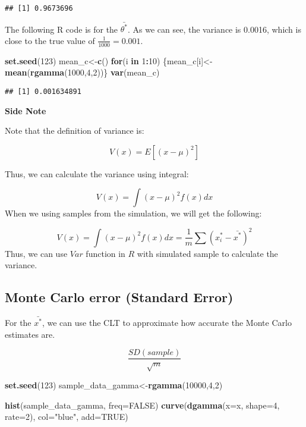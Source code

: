 \documentclass[]{book}
\newenvironment{Shaded}{\begin{snugshade}}{\end{snugshade}}
\newcommand{\ControlFlowTok}[1]{\textcolor[rgb]{0.13,0.29,0.53}{\textbf{#1}}}
\newcommand{\DataTypeTok}[1]{\textcolor[rgb]{0.13,0.29,0.53}{#1}}
\newcommand{\DecValTok}[1]{\textcolor[rgb]{0.00,0.00,0.81}{#1}}
\newcommand{\KeywordTok}[1]{\textcolor[rgb]{0.13,0.29,0.53}{\textbf{#1}}}
\newcommand{\NormalTok}[1]{#1}
\newcommand{\OperatorTok}[1]{\textcolor[rgb]{0.81,0.36,0.00}{\textbf{#1}}}
\newcommand{\OtherTok}[1]{\textcolor[rgb]{0.56,0.35,0.01}{#1}}
\newcommand{\StringTok}[1]{\textcolor[rgb]{0.31,0.60,0.02}{#1}}
\begin{document}
\begin{verbatim}
## [1] 0.9673696
\end{verbatim}

The following R code is for the \(\bar{\theta^*}\). As we can see, the variance is 0.0016, which is close to the true value of \(\frac{1}{1000}=0.001\).

\begin{Shaded}
\begin{Highlighting}[]
\KeywordTok{set.seed}\NormalTok{(}\DecValTok{123}\NormalTok{)}
\NormalTok{mean_c<-}\KeywordTok{c}\NormalTok{()}
\ControlFlowTok{for}\NormalTok{(i }\ControlFlowTok{in} \DecValTok{1}\OperatorTok{:}\DecValTok{10}\NormalTok{)}
\NormalTok{\{mean_c[i]<-}\KeywordTok{mean}\NormalTok{(}\KeywordTok{rgamma}\NormalTok{(}\DecValTok{1000}\NormalTok{,}\DecValTok{4}\NormalTok{,}\DecValTok{2}\NormalTok{))\}}
\KeywordTok{var}\NormalTok{(mean_c)}
\end{Highlighting}
\end{Shaded}

\begin{verbatim}
## [1] 0.001634891
\end{verbatim}

\textbf{Side Note}

Note that the definition of variance is:

\[V(x)=E[(x-\mu)^2]\]

Thus, we can calculate the variance using integral:

\[V(x)=\int (x-\mu)^2 f(x)dx\]
When we using samples from the simulation, we will get the following:

\[V(x)=\int (x-\mu)^2 f(x)dx= \frac{1}{m} \sum (x_i^*-\bar{x^*})^2\]
Thus, we can use \(Var\) function in \(R\) with simulated sample to calculate the variance.

\hypertarget{monte-carlo-error-standard-error}{%
\subsection{Monte Carlo error (Standard Error)}\label{monte-carlo-error-standard-error}}

For the \(\bar{x^*}\), we can use the CLT to approximate how accurate the Monte Carlo estimates are.

\[\frac{SD(sample)}{\sqrt{m}}\]

\begin{Shaded}
\begin{Highlighting}[]
\KeywordTok{set.seed}\NormalTok{(}\DecValTok{123}\NormalTok{)}
\NormalTok{sample_data_gamma<-}\KeywordTok{rgamma}\NormalTok{(}\DecValTok{10000}\NormalTok{,}\DecValTok{4}\NormalTok{,}\DecValTok{2}\NormalTok{)}

\KeywordTok{hist}\NormalTok{(sample_data_gamma, }\DataTypeTok{freq=}\OtherTok{FALSE}\NormalTok{)}
\KeywordTok{curve}\NormalTok{(}\KeywordTok{dgamma}\NormalTok{(}\DataTypeTok{x=}\NormalTok{x, }\DataTypeTok{shape=}\DecValTok{4}\NormalTok{, }\DataTypeTok{rate=}\DecValTok{2}\NormalTok{), }\DataTypeTok{col=}\StringTok{"blue"}\NormalTok{, }\DataTypeTok{add=}\OtherTok{TRUE}\NormalTok{)}
\end{Highlighting}
\end{Shaded}
\end{document}
